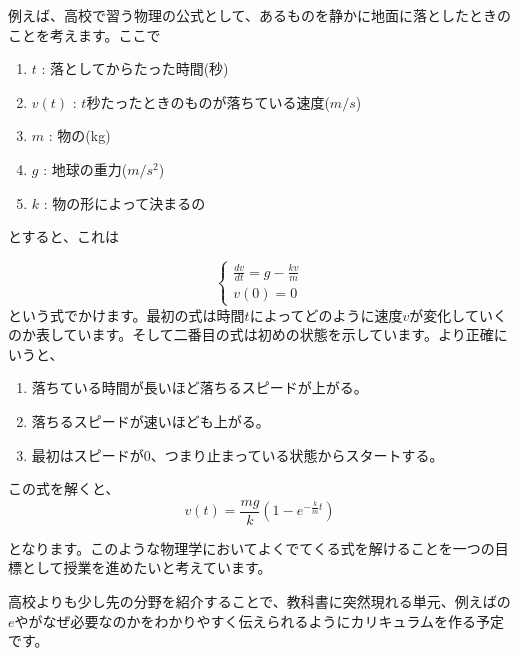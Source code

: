 \documentclass{ltjsarticle}
\begin{document}
例えば、高校で習う物理の公式として、あるものを静かに地面に落としたときのことを考えます。ここで
\begin{enumerate}
\item $t$ : 落としてからたった時間(秒)
\item $v(t)$ : $t$秒たったときのものが落ちている速度($m/s$)
\item $m$ : 物の(kg)
\item $g$ : 地球の重力($m/s^2$)
\item $k$ : 物の形によって決まるの
\end{enumerate}
とすると、これは

\begin{equation*}
\begin{cases}
{\frac {dv} {dt}} = g-{\frac {kv} m}\\
v(0) = 0
\end{cases}
\end{equation*}
という式でかけます。最初の式は時間$t$によってどのように速度$v$が変化していくのか表しています。そして二番目の式は初めの状態を示しています。より正確にいうと、
\begin{enumerate}[$\bullet$]
\item 落ちている時間が長いほど落ちるスピードが上がる。
\item 落ちるスピードが速いほども上がる。
\item 最初はスピードが$0$、つまり止まっている状態からスタートする。
\end{enumerate}
この式を解くと、
\begin{equation*}
v(t) = {\frac {mg} k}(1-e^{-{\frac k m}t})
\end{equation*}

となります。このような物理学においてよくでてくる式を解けることを一つの目標として授業を進めたいと考えています。
\par 高校よりも少し先の分野を紹介することで、教科書に突然現れる単元、例えばの$e$やがなぜ必要なのかをわかりやすく伝えられるようにカリキュラムを作る予定です。


\subsection{}
\end{document}

